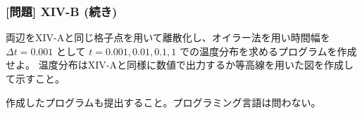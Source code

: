 \documentclass[dvipdfmx,aspectratio=169,20pt]{beamer}
\newcommand{\myfontsetting}[3]{{\fontsize{#1}{#2}\selectfont #3}}
\begin{document}
\begin{frame}
\frametitle{[問題] X\hspace{-.1em}I\hspace{-.1em}V-B (続き)}

\myfontsetting{14pt}{14pt}{
両辺をX\hspace{-.1em}I\hspace{-.1em}V-Aと同じ格子点を用いて離散化し、オイラー法を用い時間幅を $\varDelta t=0.001$ として $t=0.001, 0.01, 0.1,1$ での温度分布を求めるプログラムを作成せよ。
温度分布はX\hspace{-.1em}I\hspace{-.1em}V-Aと同様に数値で出力するか等高線を用いた図を作成して示すこと。
}

\myfontsetting{10pt}{10pt}{
作成したプログラムも提出すること。プログラミング言語は問わない。
}

\end{frame}
\end{document}
